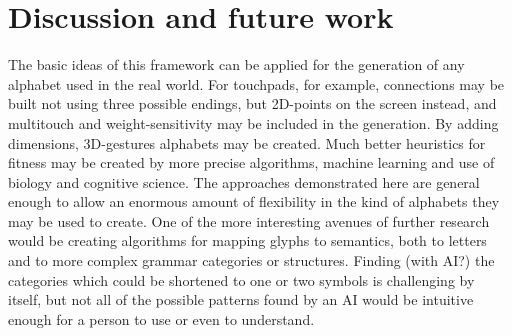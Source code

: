 \documentclass[conference]{IEEEtran}
\begin{document}
\section{Discussion and future work}
The basic ideas of this framework can be applied for the generation of any alphabet used in the real world. For touchpads, for example, connections may be built not using three possible endings, but 2D-points on the screen instead, and multitouch and weight-sensitivity may be included in the generation. By adding dimensions, 3D-gestures alphabets may be created. Much better heuristics for fitness may be created by more precise algorithms, machine learning and use of biology and cognitive science. The approaches demonstrated here are general enough to allow an enormous amount of flexibility in the kind of alphabets they may be used to create.
	One of the more interesting avenues of further research would be creating algorithms for mapping glyphs to semantics, both to letters and to more complex grammar categories or structures. Finding (with AI?) the categories which could be shortened to one or two symbols is challenging by itself, but not all of the possible patterns found by an AI would be intuitive enough for a person to use or even to understand. 



\end{document}
